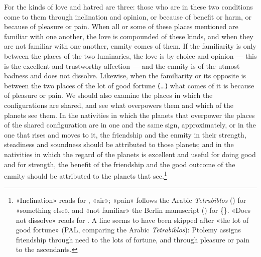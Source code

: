 \documentclass[11pt]{article}
\begin{document}
\par For the kinds of love and hatred are three: those who are in these two conditions come to them through inclination and opinion, or because of benefit or harm, or because of pleasure or pain. When all or some of these places mentioned are familiar with one another, the love is compounded of these kinds, and when they are not familiar with one another, enmity comes of them. If the familiarity is only between the places of the two luminaries, the love is by choice and opinion — this is the excellent and trustworthy affection — and the enmity is of the utmost badness and does not dissolve. Likewise, when the familiarity or its opposite is between the two places of the lot of good fortune {\mdseries ⟨}…{\mdseries ⟩} what comes of it is because of pleasure or pain. We should also examine the places in which the configurations are shared, and see what overpowers them and which of the planets see them. In the nativities in which the planets that overpower the places of the shared configuration are in one and the same sign, approximately, or in the one that rises and moves to it, the friendship and the enmity in their strength, steadiness and soundness should be attributed to those planets; and in the nativities in which the regard of the planets is excellent and useful for doing good and for strength, the benefit of the friendship and the good outcome of the enmity should be attributed to the planets that see.\footnote{«Inclination» reads  for , «air»; «pain» follows the Arabic \emph{Tetrabiblos} () for «something else», and «not familiar» the Berlin manuscript () for \{\}. «Does not dissolve» reads  for . A line seems to have been skipped after «the lot of good fortune» (PAL, comparing the Arabic \emph{Tetrabiblos}): Ptolemy assigns friendship through need to the lots of fortune, and through pleasure or pain to the ascendants.}\par
\end{document}
